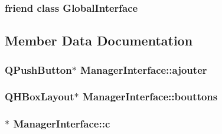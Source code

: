 \subsubsection[{\texorpdfstring{Global\+Interface}{GlobalInterface}}]{\setlength{\rightskip}{0pt plus 5cm}friend class {\bf Global\+Interface}\hspace{0.3cm}{\ttfamily [friend]}}\hypertarget{classManagerInterface_a2250a78aa5cceb79c3e34da3f1fe0fde}{}\label{classManagerInterface_a2250a78aa5cceb79c3e34da3f1fe0fde}


\subsection{Member Data Documentation}
\subsubsection[{\texorpdfstring{ajouter}{ajouter}}]{\setlength{\rightskip}{0pt plus 5cm}Q\+Push\+Button$\ast$ Manager\+Interface\+::ajouter\hspace{0.3cm}{\ttfamily [protected]}}\hypertarget{classManagerInterface_acb86b5ac8cc86654f4104ea89cbdc6fe}{}\label{classManagerInterface_acb86b5ac8cc86654f4104ea89cbdc6fe}
\subsubsection[{\texorpdfstring{bouttons}{bouttons}}]{\setlength{\rightskip}{0pt plus 5cm}Q\+H\+Box\+Layout$\ast$ Manager\+Interface\+::bouttons\hspace{0.3cm}{\ttfamily [protected]}}\hypertarget{classManagerInterface_a6e71be780b780491e8d1b4c92cc723de}{}\label{classManagerInterface_a6e71be780b780491e8d1b4c92cc723de}
\subsubsection[{\texorpdfstring{c}{c}}]{$\ast$ Manager\+Interface\+::c\hspace{0.3cm}{\ttfamily [protected]}}\hypertarget{classManagerInterface_a64c4498d646d987fa4db08bc7cdf251c}{}\label{classManagerInterface_a64c4498d646d987fa4db08bc7cdf251c}
